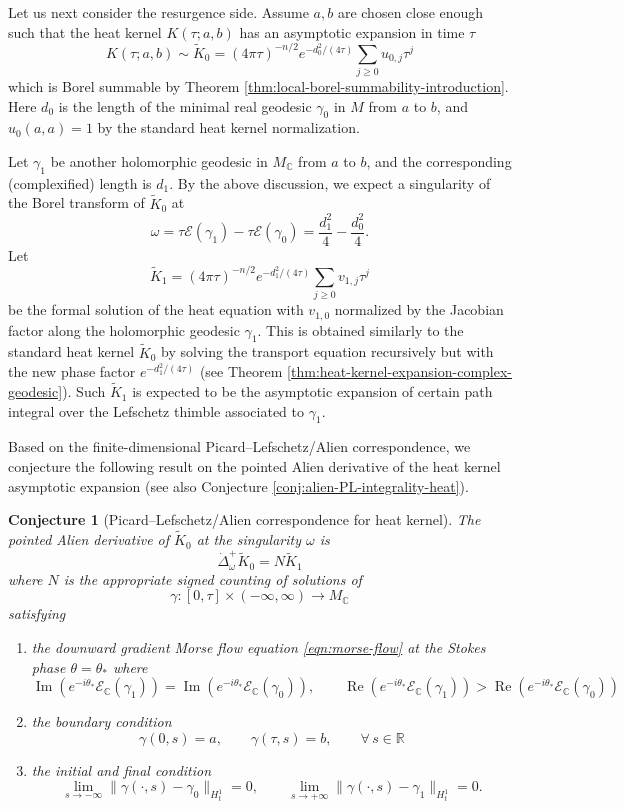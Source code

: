\documentclass[11pt]{amsart}
\theoremstyle{plain}
\newtheorem{conj}[thm]{Conjecture}
\theoremstyle{definition}
\newcommand{\R}{\mathbb{R}}
\newcommand{\C}{\mathbb{C}}
\DeclareMathOperator{\re}{Re}
\DeclareMathOperator{\im}{Im}
\begin{document}
Let us next consider the resurgence side. Assume $a,b$ are chosen close enough such that the heat kernel $K(\tau;a,b)$ has an asymptotic expansion in time $\tau$
$$
K(\tau;a,b)\sim \widetilde K_0= (4\pi \tau)^{-n/2}e^{-d_0^2/(4\tau)}\sum_{j\ge0}u_{0,j}\tau^j
$$
which is Borel summable by Theorem \ref{thm:local-borel-summability-introduction}. Here $d_0$ is the length of the minimal real geodesic $\gamma_0$ in $M$ from $a$ to $b$, and $u_0(a,a)=1$ by the standard heat kernel normalization. 

Let $\gamma_1$ be another holomorphic geodesic in $M_{\C}$ from $a$ to $b$, and the corresponding (complexified) length is $d_1$. By the above discussion, we expect a singularity of the Borel transform of $\tilde K_0$ at 
$$
\omega= \tau \mathcal E(\gamma_1)- \tau \mathcal E(\gamma_0)=\frac{d_1^2}{4}-\frac{d_0^2}{4}. 
$$
Let 
$$
\widetilde K_1= (4\pi \tau)^{-n/2}e^{-d_1^2/(4\tau)}\sum_{j\ge0}v_{1,j}\tau^j
$$
be the formal solution of the heat equation with $v_{1,0}$ normalized by the Jacobian factor along the holomorphic geodesic $\gamma_1$. This is obtained similarly to the standard heat kernel $\tilde K_0$ by solving the transport equation recursively but with the new phase factor $e^{-d_1^2/(4\tau)}$ (see Theorem \ref{thm:heat-kernel-expansion-complex-geodesic}). Such $\widetilde K_1$ is expected to be the asymptotic expansion of certain path integral over the Lefschetz thimble associated to $\gamma_1$. 

Based on the finite-dimensional Picard–Lefschetz/Alien correspondence, we conjecture the following result on the pointed Alien derivative of the heat kernel asymptotic expansion (see also Conjecture \ref{conj:alien-PL-integrality-heat}). 

\begin{conj}[Picard–Lefschetz/Alien correspondence for heat kernel]\label{conj:alien} The pointed Alien derivative of $\widetilde K_0$ at the singularity $\omega$ is 
$$
\dot\Delta_{\omega}^{+} \widetilde K_0=N \widetilde K_1
$$
where $N$ is the appropriate signed counting of solutions of 
$$
\gamma: [0,\tau]\times (-\infty,\infty)\to M_{\C}
$$
satisfying 
\begin{enumerate}
\item the downward gradient Morse flow equation \eqref{eqn:morse-flow} at the Stokes phase $\theta=\theta_*$ where
$$
\im(e^{-i\theta_*}\mathcal E_\C(\gamma_1))=\im(e^{-i\theta_*}\mathcal E_\C(\gamma_0)), \qquad \re(e^{-i\theta_*}\mathcal E_\C(\gamma_1))>\re(e^{-i\theta_*}\mathcal E_\C(\gamma_0))
$$
\item the boundary condition 
$$
\gamma(0,s)=a, \qquad \gamma(\tau,s)=b, \qquad \forall\,s\in\R
$$
\item the initial and final condition 
\[\lim_{s\rightarrow-\infty}\|\gamma(\cdot,s)-\gamma_0\|_{H_t^1}=0,\qquad \lim_{s\rightarrow+\infty}\|\gamma(\cdot,s)-\gamma_1\|_{H_t^1}=0.\]
\end{enumerate} 

\end{conj}
\end{document}
